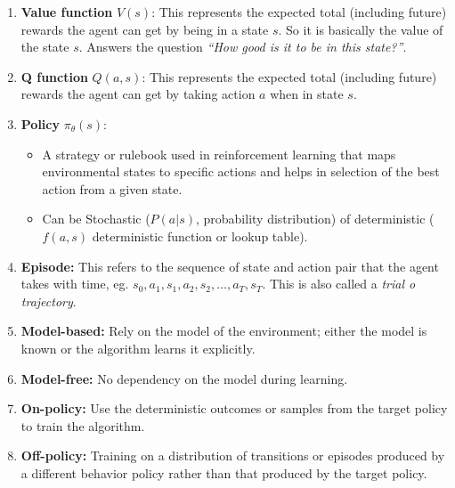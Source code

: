 \begin{tcolorbox}[title = Definitions, breakable=true]
    \begin{enumerate}
        \item \textbf{Value function} $V(s)$: This represents the expected total (including future) rewards the agent can get by being in a state $s$. So it is basically the value of the state $s$. Answers the question \textit{``How good is it to be in this state?''}.
        \item \textbf{Q function} $Q(a,s)$: This represents the expected total (including future) rewards the agent can get by taking action $a$ when in state $s$.
        \item \textbf{Policy} $\pi_{\theta}(s)$:
        \begin{itemize}
            \item A strategy or rulebook used in reinforcement learning that maps environmental states to specific actions and helps in selection of the best action from a given state. 
            \item Can be Stochastic ($P(a|s)$, probability distribution) of deterministic ($f(a,s)$ deterministic function or lookup table).
        \end{itemize} 
        \item \textbf{Episode:} This refers to the sequence of state and action pair that the agent takes with time, eg. $s_0,a_1,s_1,a_2,s_2,\ldots,a_T,s_T$. This is also called a \textit{trial o trajectory}.
        \item \textbf{Model-based:} Rely on the model of the environment; either the model is known or the algorithm learns it explicitly.
        \item \textbf{Model-free:} No dependency on the model during learning.
        \item \textbf{On-policy:} Use the deterministic outcomes or samples from the target policy to train the algorithm.
        \item \textbf{Off-policy:} Training on a distribution of transitions or episodes produced by a different behavior policy rather than that produced by the target policy.
    \end{enumerate}

\end{tcolorbox}

